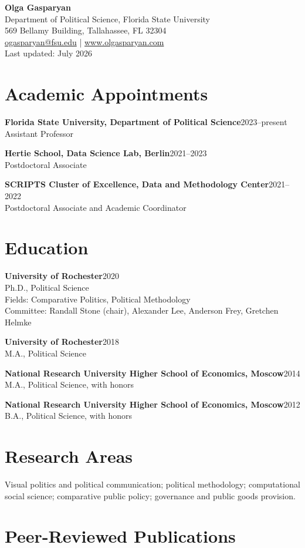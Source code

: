 \documentclass[10pt]{article}
\newcommand{\entry}[2]{\textbf{#1}\hfill #2\\}
\begin{document}
{\LARGE \textbf{Olga Gasparyan}}\\[3pt]
Department of Political Science, Florida State University\\
569 Bellamy Building, Tallahassee, FL 32304\\
\href{mailto:ogasparyan@fsu.edu}{ogasparyan@fsu.edu} \; | \; \href{http://www.olgasparyan.com}{www.olgasparyan.com}\\[-2pt]
\vspace{2pt}
{\small Last updated: July 2026}

\section{Academic Appointments}
\entry{Florida State University, Department of Political Science}{2023--present}
Assistant Professor

\entry{Hertie School, Data Science Lab, Berlin}{2021--2023}
Postdoctoral Associate

\entry{SCRIPTS Cluster of Excellence, Data and Methodology Center}{2021--2022}
Postdoctoral Associate and Academic Coordinator

\section{Education}
\entry{University of Rochester}{2020}
Ph.D., Political Science\\
Fields: Comparative Politics, Political Methodology\\
Committee: Randall Stone (chair), Alexander Lee, Anderson Frey, Gretchen Helmke

\entry{University of Rochester}{2018}
M.A., Political Science

\entry{National Research University Higher School of Economics, Moscow}{2014}
M.A., Political Science, with honors

\entry{National Research University Higher School of Economics, Moscow}{2012}
B.A., Political Science, with honors

\section{Research Areas}
Visual politics and political communication; political methodology; computational social science; comparative public policy; governance and public goods provision.

\section{Peer-Reviewed Publications}
\end{document}
